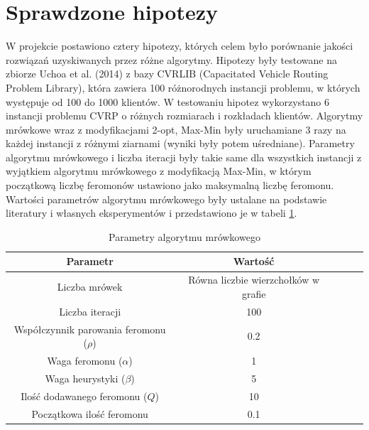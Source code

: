 \documentclass{article}
\begin{document}
\section{Sprawdzone hipotezy}
W projekcie postawiono cztery hipotezy, których celem było porównanie jakości rozwiązań uzyskiwanych przez różne algorytmy. Hipotezy były testowane na zbiorze Uchoa et al. (2014) z bazy CVRLIB (Capacitated Vehicle Routing Problem Library), która zawiera 100 różnorodnych instancji problemu, w których występuje od 100 do 1000 klientów. W testowaniu hipotez wykorzystano 6 instancji problemu CVRP o różnych rozmiarach i rozkładach klientów. Algorytmy mrówkowe wraz z modyfikacjami 2-opt, Max-Min były uruchamiane 3 razy na każdej instancji z różnymi ziarnami (wyniki były potem uśredniane). Parametry algorytmu mrówkowego i liczba iteracji były takie same dla wszystkich instancji z wyjątkiem algorytmu mrówkowego z modyfikacją Max-Min, w którym początkową liczbę feromonów ustawiono jako maksymalną liczbę feromonu. Wartości parametrów algorytmu mrówkowego były ustalane na podstawie literatury i własnych eksperymentów i przedstawiono je w tabeli \ref{tab:params}.

\begin{table}[H]
    \label{tab:params}
    \centering
    \begin{tabular}{|c|c|c|c|c|}
        \hline
        \textbf{Parametr} & \textbf{Wartość} \\
        \hline
        Liczba mrówek & Równa liczbie wierzchołków w grafie \\
        \hline
        Liczba iteracji & 100 \\
        \hline
        Współczynnik parowania feromonu ($\rho$) & 0.2 \\
        \hline
        Waga feromonu ($\alpha$) & 1 \\
        \hline
        Waga heurystyki ($\beta$) & 5 \\
        \hline
        Ilość dodawanego feromonu ($Q$) & 10 \\
        \hline
        Początkowa ilość feromonu & 0.1 \\
        \hline
    \end{tabular}
    \caption{Parametry algorytmu mrówkowego}
    \label{tab:params}
\end{table}
\end{document}
